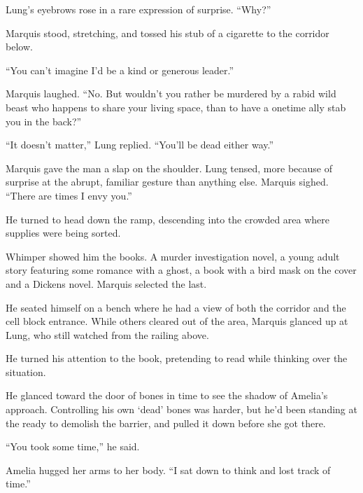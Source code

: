 Lung's eyebrows rose in a rare expression of surprise.  ``Why?''



Marquis stood, stretching, and tossed his stub of a cigarette to the corridor below.



``You can't imagine I'd be a kind or generous leader.''



Marquis laughed.  ``No.  But wouldn't you rather be murdered by a rabid wild beast who happens to share your living space, than to have a onetime ally stab you in the back?''



``It doesn't matter,'' Lung replied.  ``You'll be dead either way.''



Marquis gave the man a slap on the shoulder.  Lung tensed, more because of surprise at the abrupt, familiar gesture than anything else.  Marquis sighed.  ``There are times I envy you.''



He turned to head down the ramp, descending into the crowded area where supplies were being sorted.



Whimper showed him the books.  A murder investigation novel, a young adult story featuring some romance with a ghost, a book with a bird mask on the cover and a Dickens novel.  Marquis selected the last.



He seated himself on a bench where he had a view of both the corridor and the cell block entrance.  While others cleared out of the area, Marquis glanced up at Lung, who still watched from the railing above.



He turned his attention to the book, pretending to read while thinking over the situation.



\sectionbreak



He glanced toward the door of bones in time to see the shadow of Amelia's approach.  Controlling his own `dead' bones was harder, but he'd been standing at the ready to demolish the barrier, and pulled it down before she got there.



``You took some time,'' he said.



Amelia hugged her arms to her body.  ``I sat down to think and lost track of time.''



